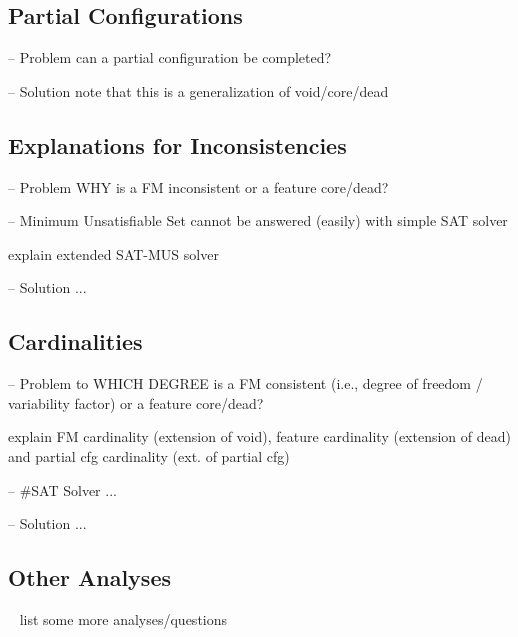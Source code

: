 \subsection{Partial Configurations}
\begin{frame}{-- Problem}
    can a partial configuration be completed?
    \end{frame}
\begin{frame}{-- Solution}
    note that this is a generalization of void/core/dead
\end{frame}

\subsection{Explanations for Inconsistencies}
\begin{frame}{-- Problem}
    WHY is a FM inconsistent or a feature core/dead?
\end{frame}
\begin{frame}{-- Minimum Unsatisfiable Set}
    cannot be answered (easily) with simple SAT solver

    explain extended SAT-MUS solver
\end{frame}
\begin{frame}{-- Solution}
    ...
\end{frame}

\subsection{Cardinalities}
\begin{frame}{-- Problem}
    to WHICH DEGREE is a FM consistent (i.e., degree of freedom / variability factor) or a feature core/dead?

    explain FM cardinality (extension of void), feature cardinality (extension of dead) and partial cfg cardinality (ext. of partial cfg)
\end{frame}
\begin{frame}{-- \#SAT Solver}
    ...
\end{frame}
\begin{frame}{-- Solution}
    ...
\end{frame}

\subsection{Other Analyses}
\begin{frame}{~}
    list some more analyses/questions
\end{frame}

